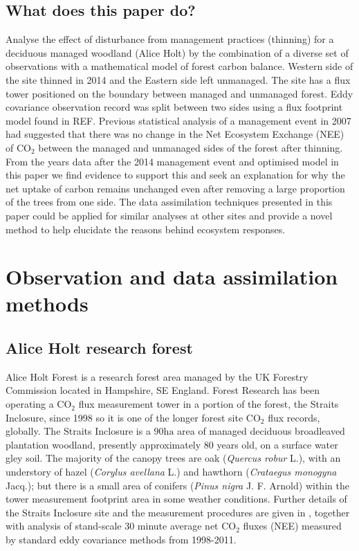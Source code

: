 \documentclass[11pt]{article}
\begin{document}
\subsection{What does this paper do?}
Analyse the effect of disturbance from management practices (thinning) for a deciduous managed woodland (Alice Holt) by the combination of a diverse set of observations with a mathematical model of forest carbon balance. Western side of the site thinned in 2014 and the Eastern side left unmanaged. The site has a flux tower positioned on the boundary between managed and unmanaged forest. Eddy covariance observation record was split between two sides using a flux footprint model found in REF. Previous statistical analysis of a management event in 2007 had suggested that there was no change in the Net Ecosystem Exchange (NEE) of CO\(_{2}\) between the managed and unmanaged sides of the forest after thinning. From the years data after the 2014 management event and optimised model in this paper we find evidence to support this and seek an explanation for why the net uptake of carbon remains unchanged even after removing a large proportion of the trees from one side. The data assimilation techniques presented in this paper could be applied for similar analyses at other sites and provide a novel method to help elucidate the reasons behind ecosystem responses.   

\section{Observation and data assimilation methods}

\subsection{Alice Holt research forest} \label{sec:site_description}

Alice Holt Forest is a research forest area managed by the UK Forestry Commission located in Hampshire, SE England. Forest Research has been operating a $\text{CO}_{2}$ flux measurement tower in a portion of the forest, the Straits Inclosure, since 1998 so it is one of the longer forest site $\text{CO}_2$ flux records, globally. The Straits Inclosure is a $90 \text{ha}$ area of managed deciduous broadleaved plantation woodland, presently approximately $80$ years old, on a surface water gley soil. The majority of the canopy trees are oak (\textit{Quercus robur} L.), with an understory of hazel (\textit{Corylus avellana} L.) and hawthorn (\textit{Crataegus monogyna} Jacq.); but there is a small area of conifers (\textit{Pinus nigra} J. F. Arnold) within the tower measurement footprint area in some weather conditions. Further details of the Straits Inclosure site and the measurement procedures are given in \citet{wilkinson2012inter}, together with analysis of stand-scale $30$ minute average net $\text{CO}_{2}$ fluxes (NEE) measured by standard eddy covariance methods from 1998-2011. 
\end{document}
